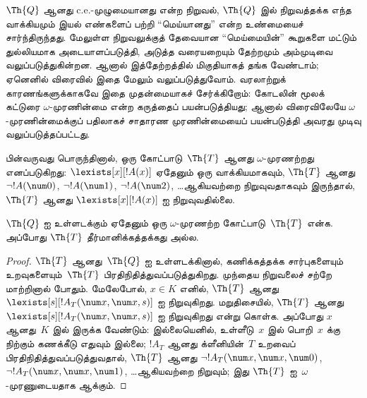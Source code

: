 \documentclass[../../../include/open-logic-section]{subfiles}
\begin{document}



\begin{explain}
$\Th{Q}$ ஆனது c.e.-முழுமையானது என்ற நிறுவல், $\Th{Q}$ இல் நிறுவத்தக்க எந்த
வாக்கியமும் இயல் எண்களைப் பற்றி “மெய்யானது” என்ற உண்மையைச்
சார்ந்திருந்தது. மேலுள்ள நிறுவலுக்குத் தேவையான “மெய்மையின்” கூறுகளை
மட்டும் துல்லியமாக அடையாளப்படுத்தி, அடுத்த வரையறையும் தேற்றமும்
அம்முடிவை வலுப்படுத்துகின்றன. ஆனால் இத்தேற்றத்தில் மிகுதியாகத் தங்க
வேண்டாம்; ஏனெனில் விரைவில் இதை மேலும் வலுப்படுத்துவோம். வரலாற்றுக்
காரணங்களுக்காகவே இதை முதன்மையாகச் சேர்க்கிறோம்: கோடலின் மூலக் கட்டுரை
$\omega$-முரணின்மை என்ற கருத்தைப் பயன்படுத்தியது; ஆனால் விரைவிலேயே
$\omega$-முரணின்மைக்குப் பதிலாகச் சாதாரண முரணின்மையைப் பயன்படுத்தி
அவரது முடிவு வலுப்படுத்தப்பட்டது.
\end{explain}

\begin{defn}
பின்வருவது பொருந்தினால், ஒரு கோட்பாடு~$\Th{T}$ ஆனது
$\omega$-முரணற்றது எனப்படுகிறது: $\lexists[x][!A(x)]$ ஏதேனும் ஒரு
வாக்கியமாகவும், $\Th{T}$ ஆனது $\lnot !A(\num 0)$,
$\lnot !A(\num 1)$, $\lnot !A(\num 2)$, \dots ஆகியவற்றை நிறுவுவதாகவும்
இருந்தால், $\Th{T}$ ஆனது $\lexists[x][!A(x)]$ ஐ நிறுவுவதில்லை.
\end{defn}

\begin{thm}
  $\Th{Q}$ ஐ உள்ளடக்கும் ஏதேனும் ஒரு $\omega$-முரணற்ற
  கோட்பாடு~$\Th{T}$ என்க. அப்போது $\Th{T}$ தீர்மானிக்கத்தக்கது அல்ல.
\end{thm}

\begin{proof}
$\Th{T}$ ஆனது~$\Th{Q}$ ஐ உள்ளடக்கினால், கணிக்கத்தக்க சார்புகளையும்
உறவுகளையும்~$\Th{T}$ பிரதிநிதித்துவப்படுத்துகிறது. முந்தைய நிறுவலைச்
சற்றே மாற்றினால் போதும். மேலேபோல், $x \in K$ எனில், $\Th{T}$ ஆனது
$\lexists[s][!A_T(\num x,\num x,s)]$ ஐ நிறுவுகிறது. மறுதிசையில்,
$\Th{T}$ ஆனது $\lexists[s][!A_T(\num x,\num x,s)]$ ஐ நிறுவுகிறது என்று
கொள்க. அப்போது $x$ ஆனது~$K$ இல் இருக்க வேண்டும்: இல்லையெனில்,
உள்ளீடு~$x$ இல் பொறி~$x$ க்கு நிற்கும் கணக்கீடு எதுவும் இல்லை;
$!A_T$ ஆனது க்ளீனியின்~$T$ உறவைப் பிரதிநிதித்துவப்படுத்துவதால்,
$\Th{T}$ ஆனது $\lnot !A_T(\num x,\num x,\num 0)$,
$\lnot !A_T(\num x,\num x,\num 1)$, \dots ஆகியவற்றை நிறுவும்; இது
$\Th{T}$ ஐ~$\omega$-முரணுடையதாக ஆக்கும்.
\end{proof}
\end{document}

